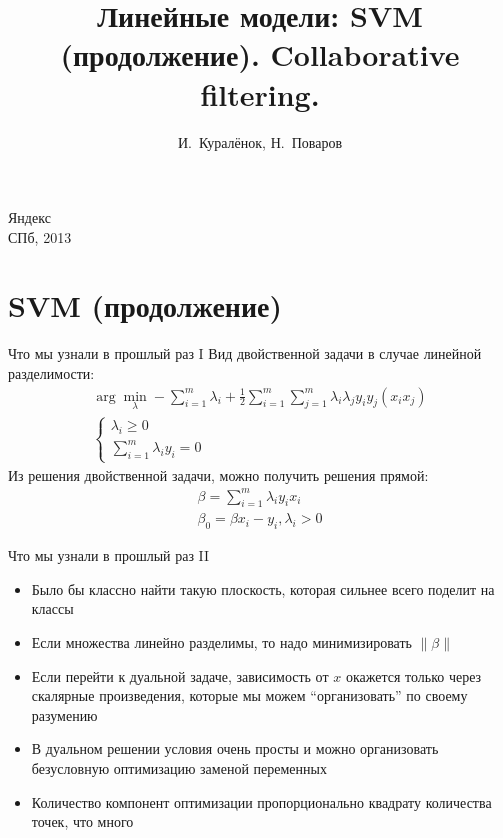 \documentclass[14pt, fleqn, xcolor={dvipsnames, table}]{beamer}
\title{Линейные модели: SVM (продолжение). Collaborative filtering.\\\small{}}
\author[]{\small{%
И.~Куралёнок,
Н.~Поваров}}
\date{}
\begin{document}
\begin{frame}

\maketitle
\small
\begin{center}
\vspace{-60pt}
\normalsize {\color{red}Я}ндекс \\
\vspace{80pt}
\footnotesize СПб, 2013
\end{center}
\end{frame}

\section{SVM (продолжение)}
\begin{frame}{Что мы узнали в прошлый раз I}
Вид двойственной задачи в случае линейной разделимости:
$$\begin{array}{l}
\arg \min_\lambda -\sum_{i=1}^m\lambda_i + \frac{1}{2}\sum_{i=1}^m\sum_{j=1}^m\lambda_i\lambda_j y_i y_j (x_i x_j) \\ 
\left\{  
  \begin{array}{ll}  
  \lambda_i \ge 0 & \\
  \sum_{i=1}^m\lambda_i y_i = 0
  \end{array}   
  \right.
\end{array}$$
Из решения двойственной задачи, можно получить решения прямой:
$$\begin{array}{l}
\beta = \sum_{i=1}^m\lambda_i y_i x_i \\
\beta_0 = \beta x_i - y_i, \lambda_i > 0
\end{array}$$
\end{frame}

\begin{frame}{Что мы узнали в прошлый раз II}
\small
\begin{itemize}
  \item Было бы классно найти такую плоскость, которая сильнее всего поделит на классы
  \item Если множества линейно разделимы, то надо минимизировать $\|\beta\|$
  \item Если перейти к дуальной задаче, зависимость от $x$ окажется только через скалярные произведения, которые мы можем ``организовать'' по своему разумению
  \item В дуальном решении условия очень просты и можно организовать безусловную оптимизацию заменой переменных
  \item Количество компонент оптимизации пропорционально квадрату количества точек, что много
\end{itemize}
\end{frame}
\end{document}
